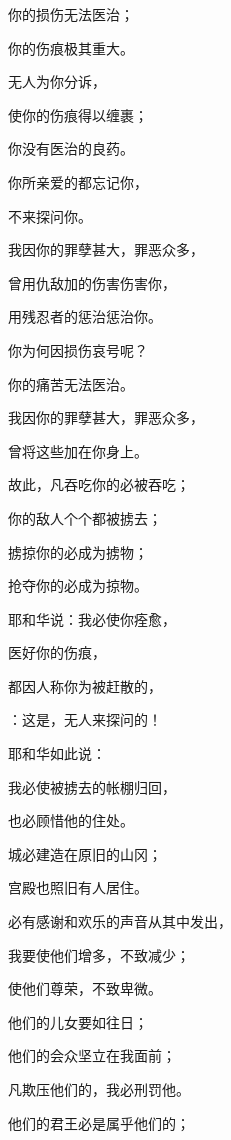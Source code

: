{\par }{\Q 你的损伤无法医治；
\par }{\Q 你的伤痕极其重大。
\par }{\Q {}无人为你分诉，
\par }{\Q 使你的伤痕得以缠裹；
\par }{\Q 你没有医治的良药。
\par }{\Q {}你所亲爱的都忘记你，
\par }{\Q 不来探问你。
\par }{\Q 我因你的罪孽甚大，罪恶众多，
\par }{\Q 曾用仇敌加的伤害伤害你，
\par }{\Q 用残忍者的惩治惩治你。
\par }{\Q {}你为何因损伤哀号呢？
\par }{\Q 你的痛苦无法医治。
\par }{\Q 我因你的罪孽甚大，罪恶众多，
\par }{\Q 曾将这些加在你身上。
\par }{\Q {}故此，凡吞吃你的必被吞吃；
\par }{\Q 你的敌人个个都被掳去；
\par }{\Q 掳掠你的必成为掳物；
\par }{\Q 抢夺你的必成为掠物。
\par }{\Q {}耶和华说：我必使你痊愈，
\par }{\Q 医好你的伤痕，
\par }{\Q 都因人称你为被赶散的，
\par }{：这是{}，无人来探问的！
\par }{\BB \par }{\Q {}耶和华如此说：
\par }{\Q 我必使{}被掳去的帐棚归回，
\par }{\Q 也必顾惜他的住处。
\par }{\Q 城必建造在原旧的山冈；
\par }{\Q 宫殿也照旧有人居住。
\par }{\Q {}必有感谢和欢乐的声音从其中发出，
\par }{\Q 我要使他们增多，不致减少；
\par }{\Q 使他们尊荣，不致卑微。
\par }{\Q {}他们的儿女要如往日；
\par }{\Q 他们的会众坚立在我面前；
\par }{\Q 凡欺压他们的，我必刑罚他。
\par }{\Q {}他们的君王必是属乎他们的；
}
